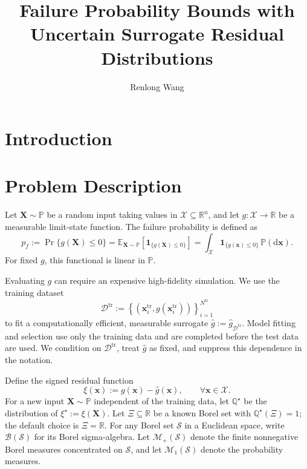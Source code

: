 \documentclass[review,11pt,3p,authoryear,nopreprintline]{elsarticle}
\begin{document}
\begin{frontmatter}
  \title{Failure Probability Bounds with Uncertain Surrogate Residual Distributions}

  \author[inst1]{Renlong Wang}

  \begin{abstract}
  \end{abstract}

  \begin{keyword}
  \end{keyword}
\end{frontmatter}

\section{Introduction}

\section{Problem Description}
\label{sec-problem}

Let $\bm X\sim\mathbb P$ be a random input taking values in $\mathcal X\subseteq\mathbb R^n$, and let $g:\mathcal X\to\mathbb R$ be a measurable limit-state function. The failure probability is defined as
\[
  p_f:=\Pr\{g(\bm X)\le0\}=\mathbb E_{\bm X\sim\mathbb P}\left[\mathbf 1_{\{g(\bm X)\le0\}}\right]=\int_{\mathcal X}\mathbf 1_{\{g(\bm x)\le0\}}\,\mathbb P(\mathrm d\bm x).
\]
For fixed $g$, this functional is linear in $\mathbb P$.

Evaluating $g$ can require an expensive high-fidelity simulation. We use the training dataset
\[
  \mathcal D^{\mathrm{tr}}:=\left\{\left(\bm x_i^{\mathrm{tr}},g(\bm x_i^{\mathrm{tr}})\right)\right\}_{i=1}^{N^{\mathrm{tr}}}
\]
to fit a computationally efficient, measurable surrogate $\hat g:=\hat g_{\mathcal D^{\mathrm{tr}}}$. Model fitting and selection use only the training data and are completed before the test data are used. We condition on $\mathcal D^{\mathrm{tr}}$, treat $\hat g$ as fixed, and suppress this dependence in the notation.

Define the signed residual function
\[
  \xi(\bm x):=g(\bm x)-\hat g(\bm x),\qquad \forall \bm x\in\mathcal X.
\]
For a new input $\bm X\sim\mathbb P$ independent of the training data, let $\mathbb Q^\star$ be the distribution of $\xi^\star:=\xi(\bm X)$. Let $\Xi\subseteq\mathbb R$ be a known Borel set with $\mathbb Q^\star(\Xi)=1$; the default choice is $\Xi=\mathbb R$. For any Borel set $\mathcal S$ in a Euclidean space, write $\mathcal B(\mathcal S)$ for its Borel sigma-algebra. Let $\mathcal M_+(\mathcal S)$ denote the finite nonnegative Borel measures concentrated on $\mathcal S$, and let $\mathcal M_1(\mathcal S)$ denote the probability measures.
\end{document}
